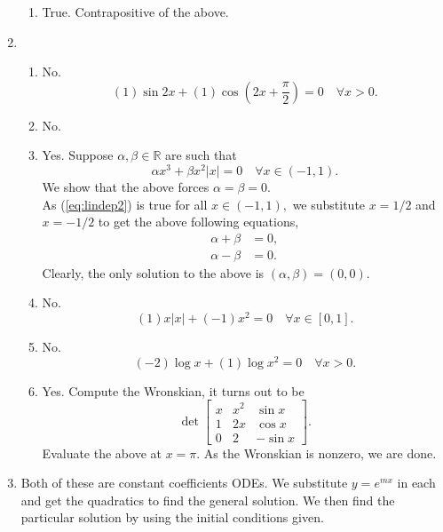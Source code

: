 \documentclass{article}
\begin{document}
\begin{enumerate}[label = Q.\arabic*.]
\begin{enumerate}[label = (\roman*)]
		\item True. Contrapositive of the above.
	\end{enumerate}
	\item 
	\begin{enumerate}[label = (\roman*)] 
		\item No.
		\begin{equation*} 
			(1)\sin2x + (1)\cos\left(2x + \frac{\pi}{2}\right) = 0 \quad \forall x > 0.
		\end{equation*}
		\item No.
		\item Yes. Suppose $\alpha, \beta \in \mathbb{R}$ are such that
		\begin{equation} \label{eq:lindep2} 
			\alpha x^3 + \beta x^2|x| = 0 \quad \forall x \in (-1, 1).
		\end{equation}
		We show that the above forces $\alpha = \beta = 0.$\\
		As (\ref{eq:lindep2}) is true for all $x \in (-1, 1),$ we substitute $x = 1/2$ and $x = -1/2$ to get the above following equations,
		\begin{align*} 
			\alpha + \beta &= 0,\\
			\alpha - \beta &= 0.
		\end{align*}
		Clearly, the only solution to the above is $(\alpha, \beta) = (0, 0).$
		\item No.
		\begin{equation*} 
			(1)x|x| + (-1)x^2 = 0 \quad \forall x \in [0, 1].
		\end{equation*}
		\item No.
		\begin{equation*} 
			(-2)\log x + (1)\log x^2 = 0 \quad \forall x > 0.
		\end{equation*}
		\item Yes. Compute the Wronskian, it turns out to be
		\[\det\begin{bmatrix}
			x & x^2 & \sin x\\
			1 & 2x & \cos x\\
			0 & 2 & -\sin x
		\end{bmatrix}.\]
		Evaluate the above at $x = \pi.$ As the Wronskian is nonzero, we are done.
	\end{enumerate}
	\item Both of these are constant coefficients ODEs. We substitute $y = e^{mx}$ in each and get the quadratics to find the general solution. We then find the particular solution by using the initial conditions given.\\

\end{enumerate}
\end{document}

